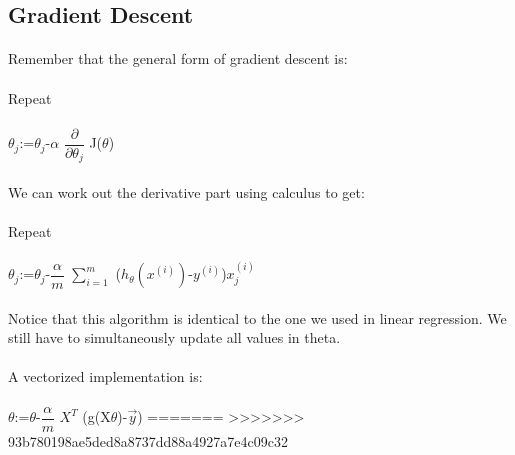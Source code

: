 \documentclass[UTF8]{ctexart}
\begin{document}
\subsection{Gradient Descent}
\paragraph{}
Remember that the general form of gradient descent is:
\begin{algorithm}
\paragraph{}
Repeat 
\paragraph{}

$\theta_{j}$:=$\theta_{j}$-$\alpha$ $\dfrac{\partial}{\partial\theta_{j}}$ J($\theta$)

\end{algorithm}
\paragraph{}
We can work out the derivative part using calculus to get:
\paragraph{}
\begin{algorithm}
\paragraph{}
Repeat 
\paragraph{}
$\theta_{j}$:=$\theta_{j}$-$\dfrac{\alpha}{m}$ $\sum\limits_{i=1}^{m}$ ($h_{\theta}(x^{(i)})$-$y^{(i)}$)$x_{j}^{(i)}$
\end{algorithm}
\paragraph{}
Notice that this algorithm is identical to the one we used in linear regression. We still have to simultaneously update all values in theta.
\paragraph{}
A vectorized implementation is:
\paragraph{}
$\theta$:=$\theta$-$\dfrac{\alpha}{m}$ $X^{T}$ (g(X$\theta$)-$\vec{y}$)
=======
>>>>>>> 93b780198ae5ded8a8737dd88a4927a7e4c09c32
\end{document}
